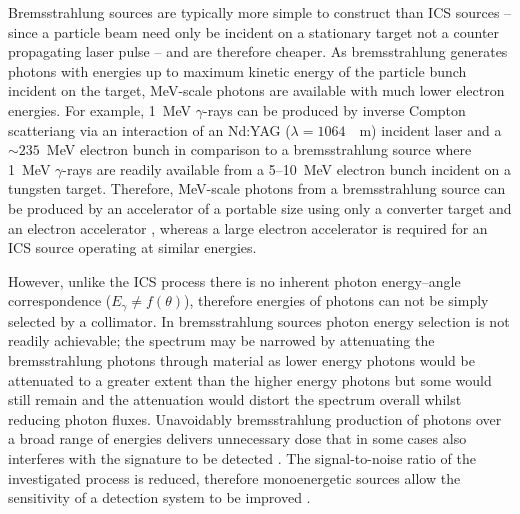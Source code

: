 \documentclass[../main.tex]{subfiles}
\begin{document}
Bremsstrahlung sources are typically more simple to construct than ICS sources -- since a particle beam need only be incident on a stationary target not a counter propagating laser pulse -- and are therefore cheaper. As bremsstrahlung generates photons with energies up to maximum kinetic energy of the particle bunch incident on the target, \si{\mega\electronvolt}-scale photons are available with much lower electron energies. For example, 1~\si{\mega\electronvolt} $\gamma$-rays can be produced by inverse Compton scatteriang via an interaction of an Nd:YAG ($\lambda = 1064$~\si{\nao\meter}) incident laser and a $\sim 235$~\si{\mega\electronvolt} electron bunch in comparison to a bremsstrahlung source where 1~\si{\mega\electronvolt} $\gamma$-rays are readily available from a 5--10~\si{\mega\electronvolt} electron bunch incident on a tungsten target. Therefore, \si{\mega\electronvolt}-scale photons from a bremsstrahlung source can be produced by an accelerator of a portable size using only a converter target and an electron
accelerator \cite{chin2021application}, whereas a large electron accelerator is required for an ICS source operating at similar energies.

However, unlike the ICS process there is no inherent photon energy--angle correspondence ($E_{\gamma}\neq f\left(\theta\right)$), therefore energies of photons can not be simply selected by a collimator. In bremsstrahlung sources photon energy selection is not readily achievable; the spectrum may be narrowed by attenuating the bremsstrahlung photons through material as lower energy photons would be attenuated to a greater extent than the higher energy photons but some would still remain and the attenuation would distort the spectrum overall whilst reducing photon fluxes. Unavoidably bremsstrahlung production of photons over a broad range of energies delivers unnecessary dose that in some cases also interferes with the signature to be detected \cite{geddes2017impact}. The signal-to-noise ratio of the investigated process is reduced, therefore monoenergetic sources allow the sensitivity of a detection system to be improved \cite{jones2008bremsstrahlung}.
\end{document}
